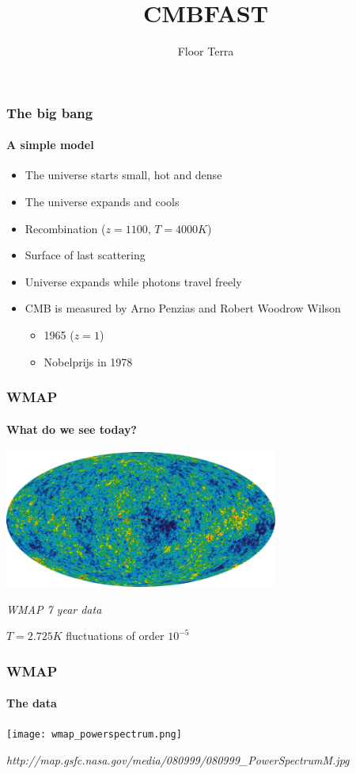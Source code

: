 \documentclass{beamer}
\title{CMBFAST}
\author{Floor Terra}
\begin{document}
	\begin{frame}
		\titlepage
	\end{frame} 
	
	\begin{frame}
		\frametitle{The big bang}
		\framesubtitle{A simple model}
		\begin{itemize}
			\item The universe starts small, hot and dense
			\item The universe expands and cools
			\item Recombination ($z=1100$, $T=4000K$)
			\item Surface of last scattering
			\item Universe expands while photons travel freely
			\item CMB is measured by Arno Penzias and Robert Woodrow Wilson 
			\begin{itemize}
				\item 1965 ($z=1$)
				\item Nobelprijs in 1978
			\end{itemize}
		\end{itemize}
	\end{frame}
	
	\begin{frame}
		\frametitle{WMAP}
		\framesubtitle{What do we see today?}
		\begin{center}
			\includegraphics[width=90mm]{WMAP.png}

			\emph{WMAP 7 year  data}

			$T=2.725K$ fluctuations of order $10^{-5}$
		\end{center}
	\end{frame}
	
	\begin{frame}
		\frametitle{WMAP}
		\framesubtitle{The data}
		\begin{center}
			\texttt{[image: wmap\_powerspectrum.png]}

			\emph{http://map.gsfc.nasa.gov/media/080999/080999\_PowerSpectrumM.jpg}
		\end{center}
	\end{frame}
	
\end{document}
